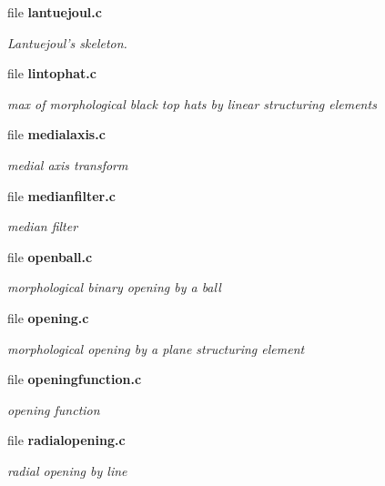 \begin{CompactItemize}
\item 
file \bf{lantuejoul.c}
\begin{CompactList}\small\item\em Lantuejoul's skeleton. \item\end{CompactList}

\item 
file \bf{lintophat.c}
\begin{CompactList}\small\item\em max of morphological black top hats by linear structuring elements \item\end{CompactList}

\item 
file \bf{medialaxis.c}
\begin{CompactList}\small\item\em medial axis transform \item\end{CompactList}

\item 
file \bf{medianfilter.c}
\begin{CompactList}\small\item\em median filter \item\end{CompactList}

\item 
file \bf{openball.c}
\begin{CompactList}\small\item\em morphological binary opening by a ball \item\end{CompactList}

\item 
file \bf{opening.c}
\begin{CompactList}\small\item\em morphological opening by a plane structuring element \item\end{CompactList}

\item 
file \bf{openingfunction.c}
\begin{CompactList}\small\item\em opening function \item\end{CompactList}

\item 
file \bf{radialopening.c}
\begin{CompactList}\small\item\em radial opening by line \item\end{CompactList}


\end{CompactItemize}
